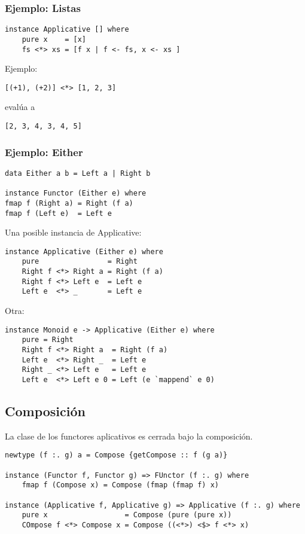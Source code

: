 \documentclass{article}
\begin{document}
\subsubsection{Ejemplo: Listas}

\begin{lstlisting}
instance Applicative [] where
    pure x    = [x]
    fs <*> xs = [f x | f <- fs, x <- xs ]
\end{lstlisting}

Ejemplo:
\begin{lstlisting}
[(+1), (+2)] <*> [1, 2, 3]
\end{lstlisting}
\indent \indent evalúa a
\begin{lstlisting}
[2, 3, 4, 3, 4, 5]
\end{lstlisting}

\subsubsection{Ejemplo: Either}

\begin{lstlisting}
data Either a b = Left a | Right b

instance Functor (Either e) where
fmap f (Right a) = Right (f a)
fmap f (Left e)  = Left e
\end{lstlisting}

Una posible instancia de Applicative:

\begin{lstlisting}
instance Applicative (Either e) where
    pure                = Right
    Right f <*> Right a = Right (f a)
    Right f <*> Left e  = Left e
    Left e  <*> _       = Left e
\end{lstlisting}

Otra:

\begin{lstlisting}
instance Monoid e -> Applicative (Either e) where
    pure = Right
    Right f <*> Right a  = Right (f a)
    Left e  <*> Right _  = Left e
    Right _ <*> Left e   = Left e
    Left e  <*> Left e 0 = Left (e `mappend` e 0)
\end{lstlisting}

\subsection{Composición}

La clase de los functores aplicativos es cerrada bajo la composición.

\begin{lstlisting}
newtype (f :. g) a = Compose {getCompose :: f (g a)}

instance (Functor f, Functor g) => FUnctor (f :. g) where
    fmap f (Compose x) = Compose (fmap (fmap f) x)
    
instance (Applicative f, Applicative g) => Applicative (f :. g) where
    pure x                  = Compose (pure (pure x))
    COmpose f <*> Compose x = Compose ((<*>) <$> f <*> x)
\end{lstlisting}
\end{document}
